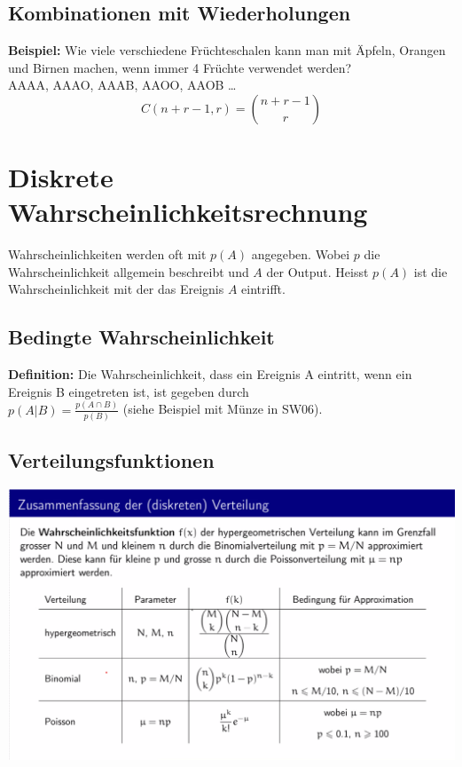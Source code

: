 \documentclass[12pt]{scrartcl}
\begin{document}
\subsection{Kombinationen mit Wiederholungen}
\textbf{Beispiel:} Wie viele verschiedene Früchteschalen kann man mit Äpfeln, Orangen und Birnen
machen, wenn immer 4 Früchte verwendet werden?\\
AAAA, AAAO, AAAB, AAOO, AAOB \dots\\

\[C(n+r-1, r) = \binom{n+r-1}{r}\]


\section{Diskrete Wahrscheinlichkeitsrechnung}
Wahrscheinlichkeiten werden oft mit $p(A)$ angegeben. Wobei $p$ die Wahrscheinlichkeit allgemein
beschreibt und $A$ der Output. Heisst $p(A)$ ist die Wahrscheinlichkeit mit der das Ereignis $A$ 
eintrifft.\\

\subsection{Bedingte Wahrscheinlichkeit}
\textbf{Definition:} Die Wahrscheinlichkeit, dass ein Ereignis A eintritt, wenn ein Ereignis B eingetreten ist, ist gegeben durch\\
$p(A|B) = \frac{p(A \cap B)}{p(B)}$ (siehe Beispiel mit Münze in SW06). 



\subsection{Verteilungsfunktionen}
\includegraphics[width=15cm]{img/zusammenfassung _verteilungen.png}
\end{document}
